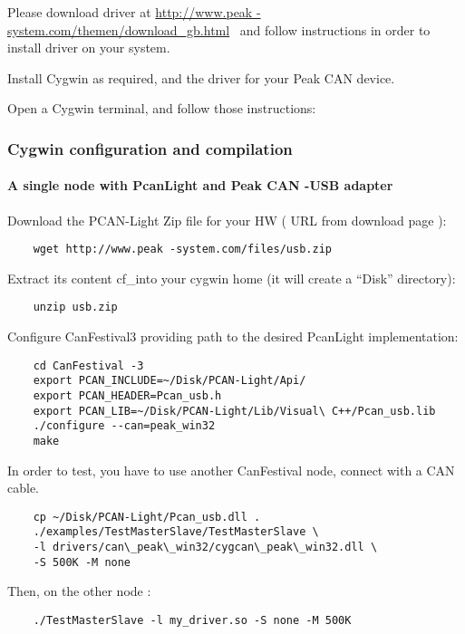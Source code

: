 \documentclass[12pt,english,a4paper]{book}
\begin{document}
Please download driver at \href{http://www.peak-system.com/themen/download_gb.html}{http://www.peak
-system.com/themen/download\_gb.html} \ and follow instructions
in order to install driver on your system.

Install Cygwin as required, and the driver for your Peak CAN device.

Open a Cygwin terminal, and follow those instructions:


\subsubsection{Cygwin configuration and compilation}


\paragraph{A single node with PcanLight and Peak CAN -USB adapter}

Download the PCAN-Light Zip file for your HW ( URL from download
page ):


\begin{verbatim}
	wget http://www.peak -system.com/files/usb.zip
\end{verbatim}


Extract its content cf_into your cygwin home (it will create a {}``Disk''
directory):


\begin{verbatim}
	unzip usb.zip
\end{verbatim}


Configure CanFestival3 providing path to the desired PcanLight implementation:


\begin{verbatim}
	cd CanFestival -3
	export PCAN_INCLUDE=~/Disk/PCAN-Light/Api/
	export PCAN_HEADER=Pcan_usb.h
	export PCAN_LIB=~/Disk/PCAN-Light/Lib/Visual\ C++/Pcan_usb.lib
	./configure --can=peak_win32
	make
\end{verbatim}


In order to test, you have to use another CanFestival node, connect
with a CAN cable.


\begin{verbatim}
	cp ~/Disk/PCAN-Light/Pcan_usb.dll .
	./examples/TestMasterSlave/TestMasterSlave \
	-l drivers/can\_peak\_win32/cygcan\_peak\_win32.dll \
	-S 500K -M none
\end{verbatim}


Then, on the other node :


\begin{verbatim}
	./TestMasterSlave -l my_driver.so -S none -M 500K
\end{verbatim}
\end{document}
